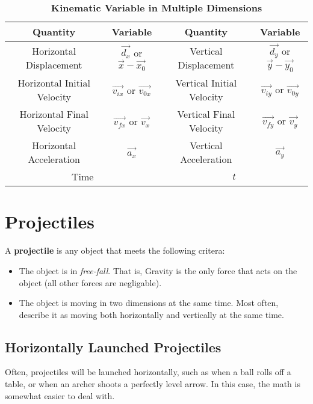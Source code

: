 	
{\renewcommand{\arraystretch}{1.2}
\begin{center}
	
	
	\begin{table}[ht]\caption{\textbf{Kinematic Variable in Multiple Dimensions}}%
		\centering %
		\begin{tabular}{|c|c||c|c|}
			\hline \hline
			\textbf{Quantity} & \textbf{Variable} & \textbf{Quantity} & \textbf{Variable}  \\
			\hline
			Horizontal Displacement & $\vec{d_x}$ or $\vec{x}-\vec{x_0}$  & Vertical Displacement & $\vec{d_y}$ or $\vec{y}-\vec{y_0}$ \\
			\hline
		
			Horizontal Initial Velocity & $\vec{v_{ix}}$ or $\vec{v_{0x}}$  & Vertical Initial Velocity & $\vec{v_{iy}}$ or $\vec{v_{0y}}$ \\
\hline

			Horizontal Final Velocity & $\vec{v_{fx}}$ or $\vec{v_x}$  & Vertical Final Velocity & $ \vec{v_{fy}}$ or $\vec{v_y}$ \\ 
	\hline
	Horizontal Acceleration & $\vec{a_x}$  &  Vertical Acceleration & $\vec{a_y} $ \\
	\hline
	\multicolumn{2}{|c|}{Time} & \multicolumn{2}{|c|}{$t$} \\
	\hline
		
		\end{tabular}
		\label{table:kinematic2d}%
	\end{table}
\end{center}

\section{Projectiles}

A \textbf{projectile} is any object that meets the following critera:
\begin{itemize}
	\item The object is in \textit{free-fall}.  That is, Gravity is the only force that acts on the object (all other forces are negligable).
	\item The object is moving in two dimensions at the same time.  Most often, describe it as moving both horizontally and vertically at the same time.  
\end{itemize}


\subsection{Horizontally Launched Projectiles}
Often, projectiles will be launched horizontally, such as when a ball rolls off a table, or when an archer shoots a perfectly level arrow.  In this case, the math is somewhat easier to deal with.

}
